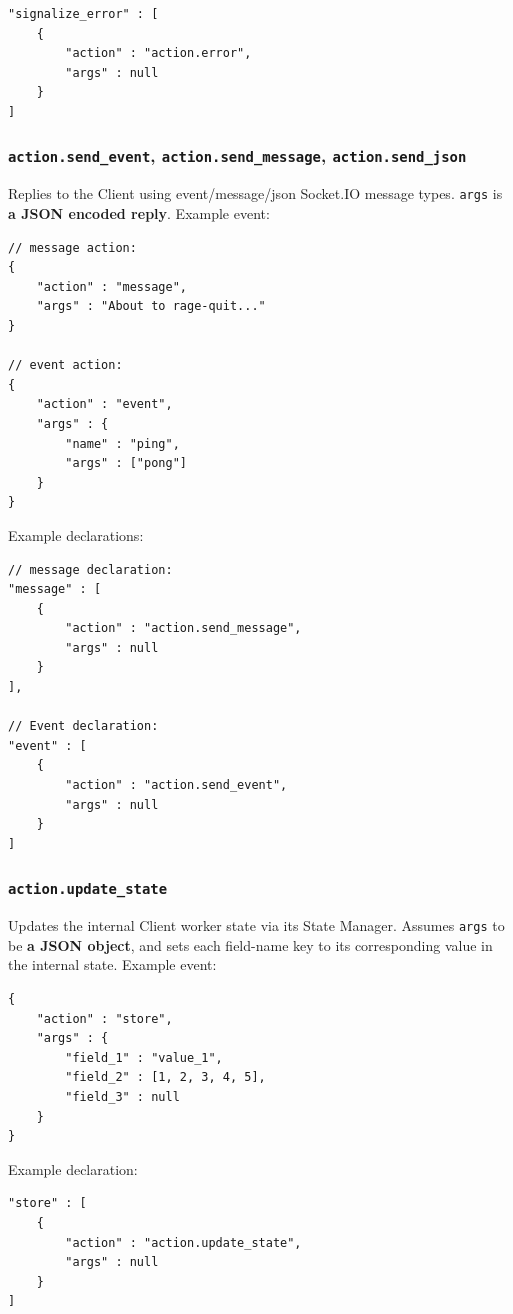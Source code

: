 \documentclass[a4paper]{article}
\begin{document}
\begin{verbatim}
"signalize_error" : [
    {
        "action" : "action.error",
        "args" : null
    }
]
\end{verbatim}
\subsubsection{\texttt{action.send\_event}, \texttt{action.send\_message}, \texttt{action.send\_json}}
\label{sec-8-3-3}

Replies to the Client using event/message/json Socket.IO message types. \texttt{args} is \textbf{a JSON encoded reply}. Example event:

\begin{verbatim}
// message action:
{
    "action" : "message",
    "args" : "About to rage-quit..."
}

// event action:
{
    "action" : "event",
    "args" : {
        "name" : "ping",
        "args" : ["pong"]
    }
}
\end{verbatim}




\noindent
Example declarations:

\begin{verbatim}
// message declaration:
"message" : [
    {
        "action" : "action.send_message",
        "args" : null
    }
],

// Event declaration:
"event" : [
    {
        "action" : "action.send_event",
        "args" : null
    }
]
\end{verbatim}
\subsubsection{\texttt{action.update\_state}}
\label{sec-8-3-4}

Updates the internal Client worker state via its State Manager. Assumes \texttt{args} to be \textbf{a JSON object}, and sets each field-name key to its corresponding value in the internal state. Example event:

\begin{verbatim}
{
    "action" : "store",
    "args" : {
        "field_1" : "value_1",
        "field_2" : [1, 2, 3, 4, 5],
        "field_3" : null
    }
}
\end{verbatim}




\noindent
Example declaration:

\begin{verbatim}
"store" : [
    {
        "action" : "action.update_state",
        "args" : null
    }
]
\end{verbatim}
\end{document}
